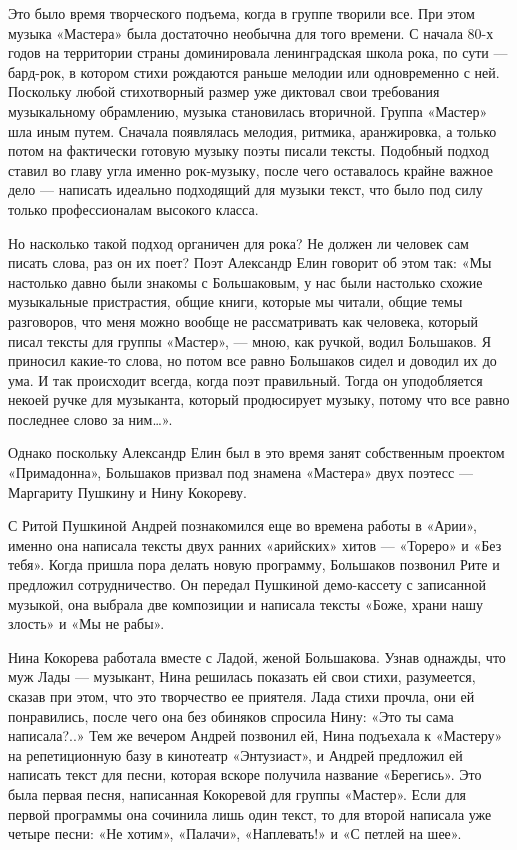 \documentclass[16pt,a5paper]{book}
\begin{document}
Это было время творческого подъема, когда в группе творили все. При этом музыка «Мастера» была достаточно необычна для
того времени. С начала 80-х годов на территории страны доминировала ленинградская школа рока, по сути — бард-рок, в
котором стихи рождаются раньше мелодии или одновременно с ней. Поскольку любой стихотворный размер уже диктовал свои
требования музыкальному обрамлению, музыка становилась вторичной. Группа «Мастер» шла иным путем. Сначала появлялась
мелодия, ритмика, аранжировка, а только потом на фактически готовую музыку поэты писали тексты. Подобный подход ставил
во главу угла именно рок-музыку, после чего оставалось крайне важное дело — написать идеально подходящий для музыки
текст, что было под силу только профессионалам высокого класса.

Но насколько такой подход органичен для рока? Не должен ли человек сам писать слова, раз он их поет? Поэт Александр Елин
говорит об этом так: «Мы настолько давно были знакомы с Большаковым, у нас были настолько схожие музыкальные
пристрастия, общие книги, которые мы читали, общие темы разговоров, что меня можно вообще не рассматривать как человека,
который писал тексты для группы «Мастер», — мною, как ручкой, водил Большаков. Я приносил какие-то слова, но потом все
равно Большаков сидел и доводил их до ума. И так происходит всегда, когда поэт правильный. Тогда он уподобляется некоей
ручке для музыканта, который продюсирует музыку, потому что все равно последнее слово за ним\ldots».

Однако поскольку Александр Елин был в это время занят собственным проектом «Примадонна», Большаков призвал под знамена
«Мастера» двух поэтесс — Маргариту Пушкину и Нину Кокореву.

С Ритой Пушкиной Андрей познакомился еще во времена работы в «Арии», именно она написала тексты двух ранних «арийских»
хитов — «Тореро» и «Без тебя». Когда пришла пора делать новую программу, Большаков позвонил Рите и предложил
сотрудничество. Он передал Пушкиной демо-кассету с записанной музыкой, она выбрала две композиции и написала тексты
«Боже, храни нашу злость» и «Мы не рабы».

Нина Кокорева работала вместе с Ладой, женой Большакова. Узнав однажды, что муж Лады — музыкант, Нина решилась показать
ей свои стихи, разумеется, сказав при этом, что это творчество ее приятеля. Лада стихи прочла, они ей понравились, после
чего она без обиняков спросила Нину: «Это ты сама написала?..» Тем же вечером Андрей позвонил ей, Нина подъехала к
«Мастеру» на репетиционную базу в кинотеатр «Энтузиаст», и Андрей предложил ей написать текст для песни, которая вскоре
получила название «Берегись». Это была первая песня, написанная Кокоревой для группы «Мастер». Если для первой программы
она сочинила лишь один текст, то для второй написала уже четыре песни: «Не хотим», «Палачи», «Наплевать!» и «С петлей на
шее».
\end{document}
